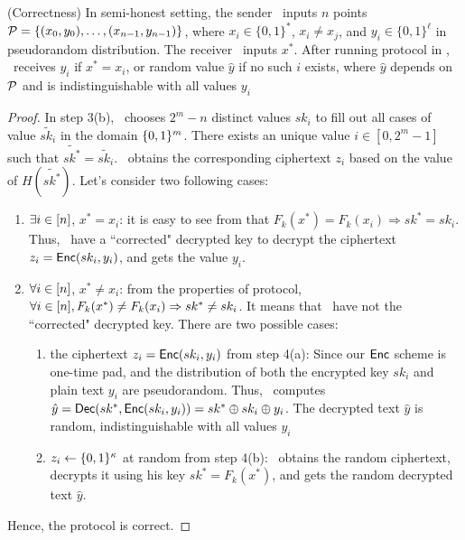 \begin{theorem} (Correctness)
	\label{thm:sotcorr}
	In semi-honest setting, the sender \SS\ inputs $n$ points $\P=\{ (x_0, y_0), \ldots, (x_{n-1}, y_{n-1}) \}$, where $x_i \in \{0,1\}^*$, $x_i \ne x_j$,  and $y_i \in \{0,1\}^\ell$ in pseudorandom distribution.  The receiver \RR\ inputs $x^*$. After running protocol in , \RR\ receives $y_i$ if $x^*=x_i$, or random value $\hat{y}$ if no such $i$ exists, where $\hat{y}$ depends on $\P$ and is indistinguishable with all values $y_i$
\end{theorem}
\begin{proof}
	In step 3(b), \SS\ chooses $2^m-n$ distinct values $sk_i$ to fill out all cases of value $\tilde{sk_i}$ in the domain $\bool^m$. There exists an unique value $i \in [0, 2^m-1]$ such that $\tilde{sk^*}  = \tilde{sk_i}$. \RR\  obtains the corresponding ciphertext $z_i$ based on the value of $H(\tilde{sk^*})$.  Let's consider two following cases:
	\begin{enumerate}
		\item $\exists i \in [\L]$, $x^*=x_i$: it is easy to see from \batchOPRF that $F_k(x^*)=F_k(x_i) \Rightarrow sk^* = sk_i$. Thus, \RR\ have a ``corrected" decrypted key to decrypt the  ciphertext $z_i = \Enc(sk_i, y_i)$, and gets the value $y_i$.
		
		\item $\forall i \in [\L]$, $x^*\neq x_i$: from the properties of \batchOPRF protocol, $\forall i \in [\L],  F_k(x^*) \ne F_k(x_i) \Rightarrow sk^* \ne sk_i$. It means that \RR\ have not the ``corrected" decrypted key. There are two possible cases:
		\begin{enumerate}
			
			\item the ciphertext $z_i= \Enc(sk_i, y_i)$ from step 4(a): Since our $\Enc$ scheme is one-time pad, and the distribution of both the encrypted key $sk_i$ and plain text $y_i$ are pseudorandom. Thus, \RR\ computes  $\hat{y}=\Dec(sk^*,\Enc(sk_i,y_i))=sk^* \oplus sk_i \oplus y_i$. The decrypted text  $\hat{y}$ is random, indistinguishable with all values $y_i$
			 
			\item $z_i \from\bool^\kappa$ at random from step 4(b):  \RR\  obtains the random ciphertext, decrypts it using his key $sk^*=F_k(x^*)$, and gets the random decrypted text $\hat{y}$.
		\end{enumerate}
		

	\end{enumerate}
	Hence, the protocol is correct.
\end{proof}


